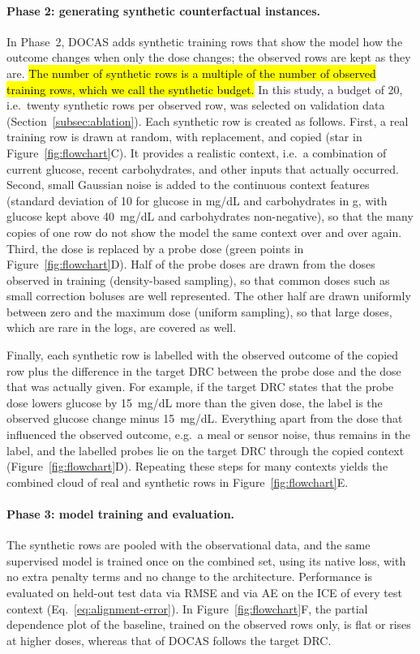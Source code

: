 \documentclass[a4paper,fleqn]{cas-sc}
\begin{document}
\paragraph{Phase 2: generating synthetic counterfactual instances.}
In Phase~2, DOCAS adds synthetic training rows that show the model how the
outcome changes when only the dose changes; the observed rows are kept as they
are. \hl{The number of synthetic rows is a multiple of the number of observed
training rows, which we call the synthetic budget.} In this study, a budget of 20, i.e.\ twenty synthetic rows per
observed row, was selected on validation data (Section~\ref{subsec:ablation}).
Each synthetic row is created as follows. First, a real training row is drawn
at random, with replacement, and copied (star in Figure~\ref{fig:flowchart}C). It provides a
realistic context, i.e.\ a combination of current glucose, recent carbohydrates,
and other inputs that actually occurred. Second, small Gaussian noise is added
to the continuous context features (standard deviation of 10 for glucose in
mg/dL and carbohydrates in g, with glucose kept above 40~mg/dL and carbohydrates
non-negative), so that the many copies of one row do not show the model the
same context over and over again. Third, the dose is replaced by a probe dose
(green points in Figure~\ref{fig:flowchart}D). Half of the probe doses are drawn from the doses
observed in training (density-based sampling), so that common doses such as
small correction boluses are well represented. The other half are drawn
uniformly between zero and the maximum dose (uniform sampling), so that large
doses, which are rare in the logs, are covered as well.

Finally, each synthetic row is labelled with the observed outcome of the copied
row plus the difference in the target DRC between the probe dose and the dose
that was actually given. For example, if the target DRC states that the probe
dose lowers glucose by 15~mg/dL more than the given dose, the label is the
observed glucose change minus 15~mg/dL. Everything apart from the dose that
influenced the observed outcome, e.g.\ a meal or sensor noise, thus remains in
the label, and the labelled probes lie on the target DRC through the copied
context (Figure~\ref{fig:flowchart}D). Repeating these steps for many contexts yields the
combined cloud of real and synthetic rows in Figure~\ref{fig:flowchart}E.

\paragraph{Phase 3: model training and evaluation.}
The synthetic rows are pooled with the observational data, and the same
supervised model is trained once on the combined set, using its native loss,
with no extra penalty terms and no change to the architecture. Performance is
evaluated on held-out test data via RMSE and via AE on the ICE of every test
context (Eq.~\ref{eq:alignment-error}). In Figure~\ref{fig:flowchart}F, the partial
dependence plot of the baseline, trained on the observed rows only, is flat or
rises at higher doses, whereas that of DOCAS follows the target DRC.
\end{document}

